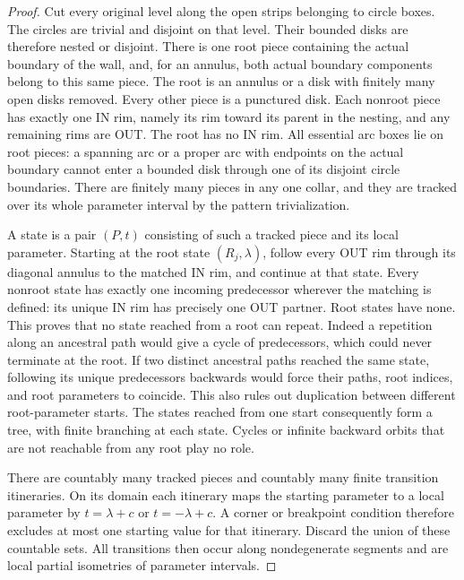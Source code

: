 \documentclass[11pt]{article}
\numberwithin{equation}{section}
\theoremstyle{definition}
\theoremstyle{remark}
\begin{document}
\begin{proof}
Cut every original level along the open strips belonging to circle boxes.
The circles are trivial and disjoint on that level.  Their bounded disks
are therefore nested or disjoint.  There is one root piece containing the
actual boundary of the wall, and, for an annulus, both actual boundary
components belong to this same piece.  The root is an annulus or a disk with
finitely many open disks removed.  Every other piece is a punctured disk.
Each nonroot piece has exactly one IN rim, namely its rim toward its parent
in the nesting, and any remaining rims are OUT.  The root has no IN rim.
All essential arc boxes lie on root pieces: a spanning arc or a proper arc
with endpoints on the actual boundary cannot enter a bounded disk through
one of its disjoint circle boundaries.  There are finitely many pieces in
any one collar, and they are tracked over its whole parameter interval by
the pattern trivialization.

A state is a pair $(P,t)$ consisting of such a tracked piece and its local
parameter.  Starting at the root state $(R_j,\lambda)$, follow every OUT rim
through its diagonal annulus to the matched IN rim, and continue at that
state.  Every nonroot state has exactly one incoming predecessor wherever
the matching is defined: its unique IN rim has precisely one OUT partner.
Root states have none.  This proves that no state reached from a root can
repeat.  Indeed a repetition along an ancestral path would give a cycle of
predecessors, which could never terminate at the root.  If two distinct
ancestral paths reached the same state, following its unique predecessors
backwards would force their paths, root indices, and root parameters to
coincide.  This also rules out duplication between different root-parameter
starts.  The states reached from one start consequently form a tree, with
finite branching at each state.  Cycles or infinite backward orbits that
are not reachable from any root play no role.

There are countably many tracked pieces and countably many finite transition
itineraries.  On its domain each itinerary maps the starting parameter to
a local parameter by $t=\lambda+c$ or $t=-\lambda+c$.  A corner or breakpoint
condition therefore excludes at most one starting value for that itinerary.
Discard the union of these countable sets.  All transitions then occur along
nondegenerate segments and are local partial isometries of parameter
intervals.


\end{proof}
\end{document}
